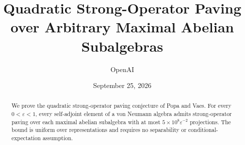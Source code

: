 \documentclass[11pt]{article}
\title{Quadratic Strong-Operator Paving over Arbitrary Maximal Abelian Subalgebras}
\author{OpenAI}
\date{September 25, 2026}
\theoremstyle{definition}
\theoremstyle{remark}
\newcommand{\eps}{\varepsilon}
\numberwithin{equation}{section}
\begin{document}
\maketitle
\begin{abstract}
We prove the quadratic strong-operator paving conjecture of Popa and Vaes.
For every $0<\eps<1$, every self-adjoint element of a von Neumann algebra
admits strong-operator paving over each maximal abelian subalgebra with at most
$5\times10^8\eps^{-2}$ projections. The bound is uniform over representations
and requires no separability or conditional-expectation assumption.
\end{abstract}









\end{document}
